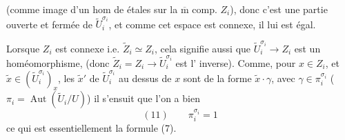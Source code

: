 (comme image d'un hom de 
étales sur la $\overline{\mathrm m}$ comp. $Z_i$), donc c'est
 une partie ouverte et fermée de
$\widetilde U_i^{\sigma_i}$, et comme cet espace est connexe,
il lui est égal.
\deleted{\[
(10)\qquad \widetilde U_i^{\sigma_i}=\operatorname{Im}(\widetilde Z_i\longrightarrow\widetilde U_i)
\]}

Lorsque $Z_i$ est  connexe i.e.
$\widetilde Z_i\simeq Z_i$, cela signifie aussi que
$\widetilde U_i^{\sigma_i}\longrightarrow Z_i$ est un homéomorphisme,
(donc $\widetilde Z_i=Z_i\longrightarrow\widetilde U_i^{\sigma_i}$ est l'
inverse). Comme, pour $x\in Z_i$,
 et $\widetilde x\in(\widetilde U_i^{\sigma_i})_x$, les
$\widetilde x'$ de $\widetilde U_i^{\sigma_i}$ au dessus de $x$ sont   de
la forme $\widetilde x\cdot\gamma$, avec $\gamma\in\pi_i^{\sigma_i}$
($\pi_i=\operatorname{Aut}(\widetilde U_i/U)$) il s'ensuit que l'on
a bien
\[
(11)\qquad \pi_i^{\sigma_i}=1
\]
ce qui est essentiellement la formule (7).

